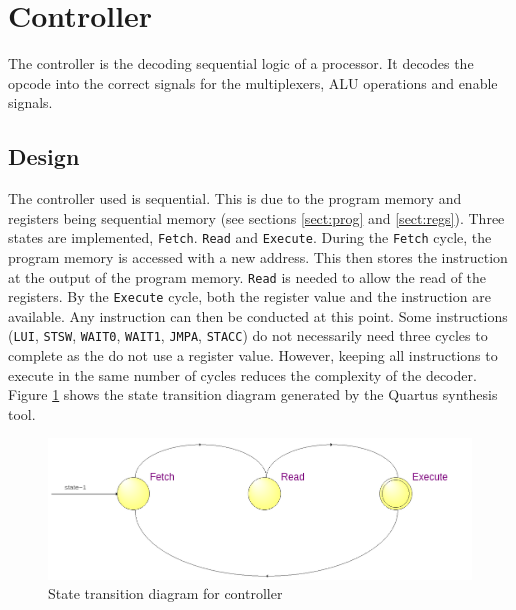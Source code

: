

\section{Controller}\label{sect:controller}

The controller is the decoding sequential logic of a processor. 
It decodes the opcode into the correct signals for the multiplexers, ALU operations and enable signals.


\subsection{Design}

The controller used is sequential. 
This is due to the program memory and registers being sequential memory (see sections \ref{sect:prog} and \ref{sect:regs}).
Three states are implemented, \texttt{Fetch}. \texttt{Read} and \texttt{Execute}. 
During the \texttt{Fetch} cycle, the program memory is accessed with a new address. 
This then stores the instruction at the output of the program memory. 
\texttt{Read} is needed to allow the read of the registers. 
By the \texttt{Execute} cycle, both the register value and the instruction are available. 
Any instruction can then be conducted at this point.
Some instructions (\texttt{LUI}, \texttt{STSW}, \texttt{WAIT0}, \texttt{WAIT1}, \texttt{JMPA}, \texttt{STACC}) do not necessarily need three cycles to complete as the do not use a register value.
However, keeping all instructions to execute in the same number of cycles reduces the complexity of the decoder. 
Figure \ref{fig:controllerasm} shows the state transition diagram generated by the Quartus synthesis tool.

\begin{figure}
\includegraphics[width=\textwidth]{Figures/cpu_control_state.png}
\caption{State transition diagram for controller}
\label{fig:controllerasm}
\end{figure}

